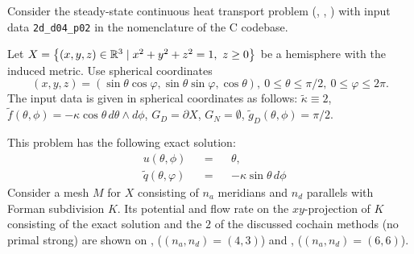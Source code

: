 \begin{example}
  \label{cmc/diffusion/continuous/steady_state/examples/2d_d04_p02-example}
  Consider the steady-state continuous heat transport problem
  (,
   ,
   )
  with input data \verb|2d_d04_p02| in the nomenclature of the C codebase.

  Let $X = \left\{ (x, y, z) \in \mathbb{R}^3 \mid x^2 + y^2 + z^2 = 1,\ z \geq 0 \right\}$ be a
  hemisphere with the induced metric.
  Use spherical coordinates
  \begin{equation}
    (x, y, z)
    = (\sin \theta \cos \varphi, \sin \theta \sin \varphi, \cos \theta),\
    0 \leq \theta \leq \pi / 2,\
    0 \leq \varphi \leq 2 \pi.
  \end{equation}
  The input data is given in spherical coordinates as follows:
    $\tilde{\kappa} \equiv 2$,
    $\tilde{f}(\theta, \phi) = - \kappa \cos \theta\, d \theta \wedge d \phi$,
    $G_D = \partial X$,
    $G_N = \emptyset$,
    $\tilde{g}_D(\theta, \phi) = \pi / 2$.

  This problem has the following exact solution:
  \begin{subequations}
    \begin{alignat}{3}
      & u(\theta, \phi) && = && \theta, \\
      & \tilde{q}(\theta, \varphi) && = && - \kappa \sin \theta\, d \phi
    \end{alignat}
  \end{subequations}
  Consider a mesh $M$ for $X$ consisting of $n_a$ meridians and $n_d$ parallels
  with Forman subdivision $K$.
  Its potential and flow rate on the $xy$-projection of $K$ consisting of the
  exact solution and the $2$ of the discussed cochain methods (no primal strong)
  are shown on
  ,
  ($(n_a, n_d) = (4, 3)$)
  and
  ,
  ($(n_a, n_d) = (6, 6)$).
\end{example}
